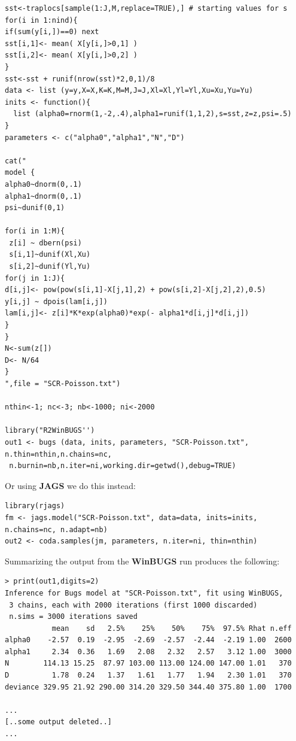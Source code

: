 {\small
\begin{verbatim}
sst<-traplocs[sample(1:J,M,replace=TRUE),] # starting values for s
for(i in 1:nind){
if(sum(y[i,])==0) next
sst[i,1]<- mean( X[y[i,]>0,1] )
sst[i,2]<- mean( X[y[i,]>0,2] )
}
sst<-sst + runif(nrow(sst)*2,0,1)/8
data <- list (y=y,X=X,K=K,M=M,J=J,Xl=Xl,Yl=Yl,Xu=Xu,Yu=Yu)
inits <- function(){
  list (alpha0=rnorm(1,-2,.4),alpha1=runif(1,1,2),s=sst,z=z,psi=.5)
}
parameters <- c("alpha0","alpha1","N","D")

cat("
model {
alpha0~dnorm(0,.1)
alpha1~dnorm(0,.1)
psi~dunif(0,1)

for(i in 1:M){
 z[i] ~ dbern(psi)
 s[i,1]~dunif(Xl,Xu)
 s[i,2]~dunif(Yl,Yu)
for(j in 1:J){
d[i,j]<- pow(pow(s[i,1]-X[j,1],2) + pow(s[i,2]-X[j,2],2),0.5)
y[i,j] ~ dpois(lam[i,j])
lam[i,j]<- z[i]*K*exp(alpha0)*exp(- alpha1*d[i,j]*d[i,j])
}
}
N<-sum(z[])
D<- N/64
}
",file = "SCR-Poisson.txt")

nthin<-1; nc<-3; nb<-1000; ni<-2000

library("R2WinBUGS'')
out1 <- bugs (data, inits, parameters, "SCR-Poisson.txt", n.thin=nthin,n.chains=nc,
 n.burnin=nb,n.iter=ni,working.dir=getwd(),debug=TRUE)
\end{verbatim}
}
{\flushleft Or using {\bf JAGS}  we do this instead: }
{\small
\begin{verbatim}
library(rjags)
fm <- jags.model("SCR-Poisson.txt", data=data, inits=inits, n.chains=nc, n.adapt=nb)
out2 <- coda.samples(jm, parameters, n.iter=ni, thin=nthin)
\end{verbatim}
}
{\flushleft 
Summarizing } the output from the {\bf WinBUGS}  run produces the following:
{\small
\begin{verbatim}
> print(out1,digits=2)
Inference for Bugs model at "SCR-Poisson.txt", fit using WinBUGS,
 3 chains, each with 2000 iterations (first 1000 discarded)
 n.sims = 3000 iterations saved
           mean    sd   2.5%    25%    50%    75%  97.5% Rhat n.eff
alpha0    -2.57  0.19  -2.95  -2.69  -2.57  -2.44  -2.19 1.00  2600
alpha1     2.34  0.36   1.69   2.08   2.32   2.57   3.12 1.00  3000
N        114.13 15.25  87.97 103.00 113.00 124.00 147.00 1.01   370
D          1.78  0.24   1.37   1.61   1.77   1.94   2.30 1.01   370
deviance 329.95 21.92 290.00 314.20 329.50 344.40 375.80 1.00  1700

...
[..some output deleted..]
...
\end{verbatim}
}



